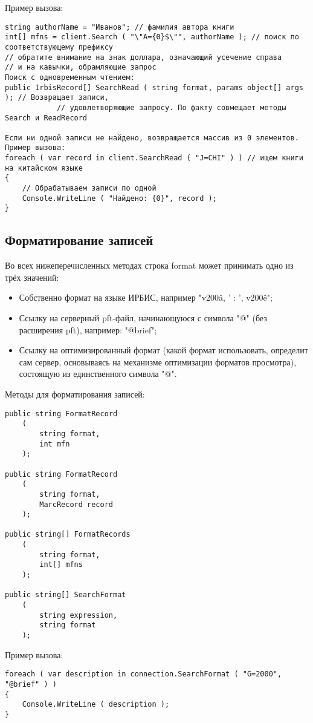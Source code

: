 Пример вызова:
\begin{lstlisting}
string authorName = "Иванов"; // фамилия автора книги
int[] mfns = client.Search ( "\"A={0}$\"", authorName ); // поиск по соответствующему префиксу
// обратите внимание на знак доллара, означающий усечение справа
// и на кавычки, обрамляющие запрос
Поиск с одновременным чтением: 
public IrbisRecord[] SearchRead ( string format, params object[] args ); // Возвращает записи,
			// удовлетворяющие запросу. По факту совмещает методы Search и ReadRecord

Если ни одной записи не найдено, возвращается массив из 0 элементов. 
Пример вызова: 
foreach ( var record in client.SearchRead ( "J=CHI" ) ) // ищем книги на китайском языке
{
	// Обрабатываем записи по одной
	Console.WriteLine ( "Найдено: {0}", record );
}
\end{lstlisting}

\subsection{Форматирование записей}
 
Во всех нижеперечисленных методах строка format может принимать одно из трёх значений:
\begin{itemize}
	\item Собственно формат на языке ИРБИС, например "v200\^a, ' : ', v200\^e";
	\item Ссылку на серверный pft-файл, начинающуюся с символа "@" (без расширения pft), например: "@brief";
	\item Ссылку на оптимизированный формат (какой формат использовать, определит сам сервер, основываясь на механизме оптимизации форматов просмотра), состоящую из единственного символа "@".
\end{itemize}

Методы для форматирования записей: 
\begin{lstlisting}
public string FormatRecord
	(
		string format,
		int mfn
	);
	
public string FormatRecord
	(
		string format,
		MarcRecord record
	);
	
public string[] FormatRecords
	(
		string format,
		int[] mfns
	);
	
public string[] SearchFormat
	(
		string expression,
		string format
	);
\end{lstlisting}
Пример вызова:
\begin{lstlisting}
foreach ( var description in connection.SearchFormat ( "G=2000", "@brief" ) )
{
	Console.WriteLine ( description );
}
\end{lstlisting}
